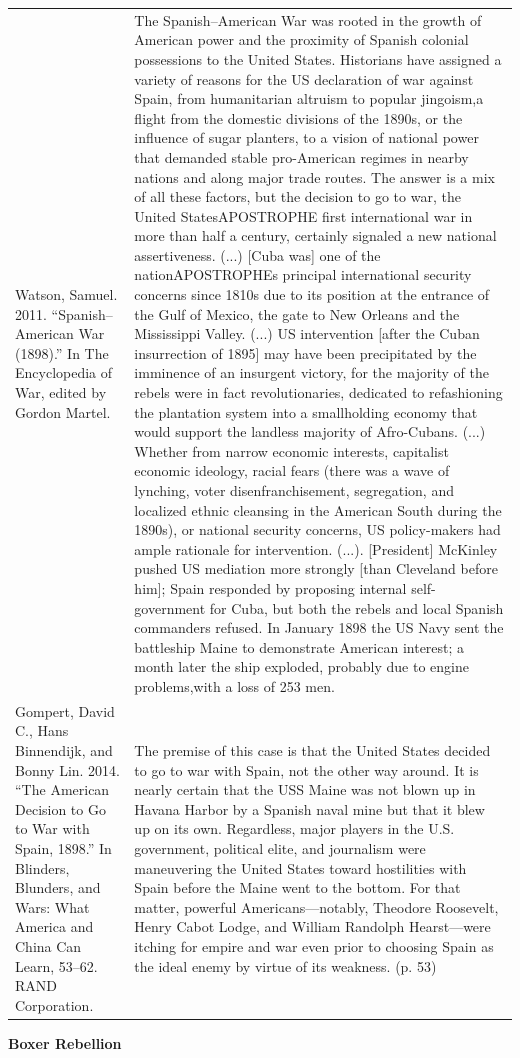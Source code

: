{\begin{longtable}{p{}p{}}
Watson, Samuel. 2011. “Spanish–American War (1898).” In The Encyclopedia of War, edited by Gordon Martel. & The Spanish–American War was rooted in the growth of American power and the proximity of Spanish colonial possessions to the United States. Historians have assigned a variety of reasons for the US declaration of war against Spain, from humanitarian altruism to popular jingoism,a flight from the domestic divisions of the 1890s, or the influence of sugar planters, to a vision of national power that demanded stable pro-American regimes in nearby nations and along major trade routes. The answer is a mix of all these factors, but the decision to go to war, the United StatesAPOSTROPHE first international war in more than half a century, certainly signaled a new national assertiveness. (...) [Cuba was] one of the nationAPOSTROPHEs principal international security concerns since 1810s due to its position at the entrance of the Gulf of Mexico, the gate to New Orleans and the Mississippi Valley. (...) US intervention [after the Cuban insurrection of 1895] may have been precipitated by the imminence of an insurgent victory, for the majority of the rebels were in fact revolutionaries, dedicated to refashioning the plantation system into a smallholding economy that would support the landless majority of Afro-Cubans. (...) Whether from narrow economic interests, capitalist economic ideology, racial fears (there was a wave of lynching, voter disenfranchisement, segregation, and localized ethnic cleansing in the American South during the 1890s), or national security concerns, US policy-makers had ample rationale for intervention. (...). [President] McKinley pushed US mediation more strongly [than Cleveland before him]; Spain responded by proposing internal self-government for Cuba, but both the rebels and local Spanish commanders refused. In January 1898 the US Navy sent the battleship Maine to demonstrate American interest; a month later the ship exploded, probably due to engine problems,with a loss of 253 men. 
\\
Gompert, David C., Hans Binnendijk, and Bonny Lin. 2014. “The American Decision to Go to War with Spain, 1898.” In Blinders, Blunders, and Wars: What America and China Can Learn, 53–62. RAND Corporation. & The premise of this case is that the United States decided to go to war with Spain, not the other way around. It is nearly certain that the USS Maine was not blown up in Havana Harbor by a Spanish naval mine but that it blew up on its own. Regardless, major players in the U.S. government, political elite, and journalism were maneuvering the United States toward hostilities with Spain before the Maine went to the bottom. For that matter, powerful Americans—notably, Theodore Roosevelt, Henry Cabot Lodge, and William Randolph Hearst—were itching for empire and war even prior to choosing Spain as the ideal enemy by virtue of its weakness. (p. 53)
\\
\end{longtable}}
\clearpage
         \textbf{Boxer Rebellion} 


